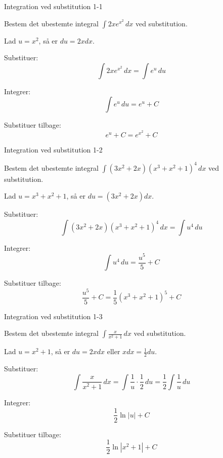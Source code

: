 \documentclass{article}
\begin{document}

\tableofcontents
\newpage

\begin{exercise}{Integration ved substitution 1-1}

Bestem det ubestemte integral $\int 2x e^{x^2} \, dx$ ved substitution.


\hint

Lad $u = x^2$, så er $du = 2x dx$.

\hint

Substituer:
\[
\int 2x e^{x^2} \, dx = \int e^u \, du
\]

\hint

Integrer:
\[
\int e^u \, du = e^u + C
\]

\hint

Substituer tilbage:
\[
e^u + C = e^{x^2} + C
\]

\end{exercise}

\newpage

\begin{exercise}{Integration ved substitution 1-2}

Bestem det ubestemte integral $\int (3x^2 + 2x)(x^3 + x^2 + 1)^4 \, dx$ ved substitution.


\hint

Lad $u = x^3 + x^2 + 1$, så er $du = (3x^2 + 2x) dx$.

\hint

Substituer:
\[
\int (3x^2 + 2x)(x^3 + x^2 + 1)^4 \, dx = \int u^4 \, du
\]

\hint

Integrer:
\[
\int u^4 \, du = \frac{u^5}{5} + C
\]

\hint

Substituer tilbage:
\[
\frac{u^5}{5} + C = \frac{1}{5}(x^3 + x^2 + 1)^5 + C
\]

\end{exercise}

\newpage

\begin{exercise}{Integration ved substitution 1-3}

Bestem det ubestemte integral $\int \frac{x}{x^2 + 1} \, dx$ ved substitution.


\hint

Lad $u = x^2 + 1$, så er $du = 2x dx$ eller $x dx = \frac{1}{2} du$.

\hint

Substituer:
\[
\int \frac{x}{x^2 + 1} \, dx = \int \frac{1}{u} \cdot \frac{1}{2} \, du = \frac{1}{2} \int \frac{1}{u} \, du
\]

\hint

Integrer:
\[
\frac{1}{2} \ln|u| + C
\]

\hint

Substituer tilbage:
\[
\frac{1}{2}\ln|x^2 + 1| + C
\]

\end{exercise}
\end{document}
